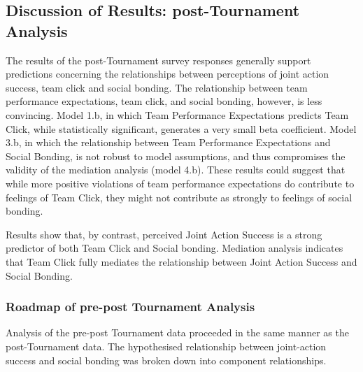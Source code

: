 {%


\subsection{Discussion of Results: post-Tournament Analysis}
The results of the post-Tournament survey responses generally support predictions concerning the relationships between perceptions of joint action success, team click and social bonding.  The relationship between team performance expectations, team click, and social bonding, however, is less convincing.  Model 1.b, in which Team Performance Expectations predicts Team Click, while statistically significant, generates a very small beta coefficient.  Model 3.b, in which the relationship between Team Performance Expectations and Social Bonding, is not robust to model assumptions, and thus compromises the validity of the mediation analysis (model 4.b).  These results could suggest that while more positive violations of team performance expectations do contribute to feelings of Team Click, they might not contribute as strongly to feelings of social bonding.

Results show that, by contrast, perceived Joint Action Success is a strong predictor of both Team Click and Social bonding. Mediation analysis indicates that Team Click fully mediates the relationship between Joint Action Success and Social Bonding.




















\subsubsection{Roadmap of pre-post Tournament Analysis}
Analysis of the pre-post Tournament data proceeded in the same manner as the post-Tournament data. The hypothesised relationship between joint-action success and social bonding was broken down into component relationships. \\

}
